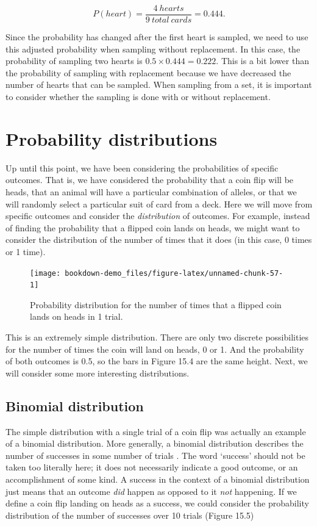 \documentclass[
]{scrbook}
\begin{document}
\[P(heart) = \frac{4\:hearts}{9\:total\:cards} = 0.444.\]

Since the probability has changed after the first heart is sampled, we need to use this adjusted probability when sampling without replacement.
In this case, the probability of sampling two hearts is \(0.5 \times 0.444 = 0.222\).
This is a bit lower than the probability of sampling with replacement because we have decreased the number of hearts that can be sampled.
When sampling from a set, it is important to consider whether the sampling is done with or without replacement.

\hypertarget{probability-distributions}{%
\section{Probability distributions}\label{probability-distributions}}

Up until this point, we have been considering the probabilities of specific outcomes.
That is, we have considered the probability that a coin flip will be heads, that an animal will have a particular combination of alleles, or that we will randomly select a particular suit of card from a deck.
Here we will move from specific outcomes and consider the \emph{distribution} of outcomes.
For example, instead of finding the probability that a flipped coin lands on heads, we might want to consider the distribution of the number of times that it does (in this case, 0 times or 1 time).

\begin{figure}
\texttt{[image: bookdown-demo\_files/figure-latex/unnamed-chunk-57-1]} \caption{Probability distribution for the number of times that a flipped coin lands on heads in 1 trial.}\label{fig:unnamed-chunk-57}
\end{figure}

This is an extremely simple distribution.
There are only two discrete possibilities for the number of times the coin will land on heads, 0 or 1.
And the probability of both outcomes is 0.5, so the bars in Figure 15.4 are the same height.
Next, we will consider some more interesting distributions.

\hypertarget{binomial-distribution}{%
\subsection{Binomial distribution}\label{binomial-distribution}}

The simple distribution with a single trial of a coin flip was actually an example of a binomial distribution.
More generally, a binomial distribution describes the number of successes in some number of trials \citep{Miller2004}.
The word `success' should not be taken too literally here; it does not necessarily indicate a good outcome, or an accomplishment of some kind.
A success in the context of a binomial distribution just means that an outcome \emph{did} happen as opposed to it \emph{not} happening.
If we define a coin flip landing on heads as a success, we could consider the probability distribution of the number of successes over 10 trials (Figure 15.5)
\end{document}
